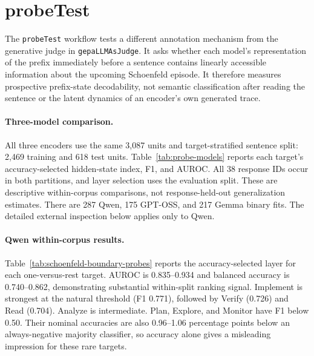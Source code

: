 \section{probeTest}

The \texttt{probeTest} workflow tests a different annotation mechanism from
the generative judge in \texttt{gepaLLMAsJudge}.  It asks whether each model's
representation of the prefix
immediately before a sentence contains linearly accessible information about
the upcoming Schoenfeld episode.  It therefore measures prospective
prefix-state decodability, not semantic classification after reading the
sentence or the latent dynamics of an encoder's own generated trace.

\paragraph{Three-model comparison.}
All three encoders use the same 3,087 units and target-stratified sentence
split: 2,469 training and 618 test units. Table~\ref{tab:probe-models}
reports each target's accuracy-selected hidden-state index, F1, and AUROC.
All 38 response IDs occur in both partitions, and layer selection uses the
evaluation split. These are descriptive within-corpus comparisons, not
response-held-out generalization estimates. There are 287 Qwen, 175 GPT-OSS,
and 217 Gemma binary fits. The detailed external inspection below applies
only to Qwen.


\paragraph{Qwen within-corpus results.}
Table~\ref{tab:schoenfeld-boundary-probes} reports the accuracy-selected layer
for each one-versus-rest target.  AUROC is 0.835--0.934 and balanced accuracy
is 0.740--0.862, demonstrating substantial within-split ranking signal.
Implement is strongest at the natural threshold (F1 0.771), followed by
Verify (0.726) and Read (0.704).  Analyze is intermediate.  Plan, Explore, and
Monitor have F1 below 0.50.  Their nominal accuracies are also 0.96--1.06
percentage points below an always-negative majority classifier, so accuracy
alone gives a misleading impression for these rare targets.

